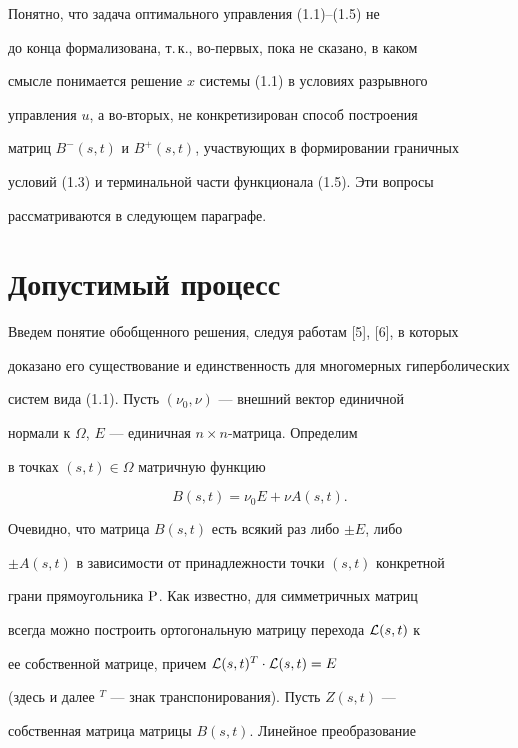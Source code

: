 Понятно, что задача оптимального управления (1.1)--(1.5) не


до конца формализована, т.\,к., во-первых, пока не сказано, в каком


смысле понимается решение $x$ системы (1.1) в условиях разрывного


управления $u$, а во-вторых, не конкретизирован способ построения


матриц $B^-(s,t)$ и $B^+(s,t)$, участвующих в формировании граничных


условий (1.3) и терминальной части функционала (1.5). Эти вопросы


рассматриваются в следующем параграфе.





\section{Допустимый процесс}





Введем понятие обобщенного решения, следуя работам [5], [6], в которых


доказано его существование и единственность для многомерных гиперболических


систем вида (1.1). Пусть $(\nu_0, \nu)$ --- внешний вектор единичной


нормали к $\Omega$, $E$ --- единичная $n \times n$-матрица. Определим


в точках $(s,t) \in \Omega$ матричную функцию


$$


B(s,t) = \nu_0 E + \nu A(s,t). 


$$


Очевидно, что матрица $B(s,t)$ есть всякий раз либо $\pm E$, либо


$\pm A(s,t)$ в зависимости от принадлежности точки $(s,t)$ конкретной


грани прямоугольника $\P$. Как известно, для симметричных матриц


всегда можно построить ортогональную матрицу перехода ${\cal L}(s,t)$ к


ее собственной матрице, причем ${\cal L}(s,t)^{T} \cdot {\cal L}(s,t) = E$


(здесь и далее $^{T}$ --- знак транспонирования). Пусть $Z(s,t)$ ---


собственная матрица матрицы $B(s,t)$. Линейное преобразование


